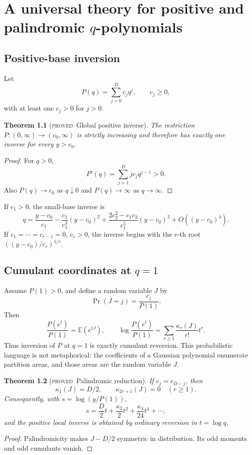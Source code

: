 \documentclass[11pt,letterpaper,oneside,openany]{book}
\newtheorem{theorem}{Theorem}[chapter]
\theoremstyle{definition}
\theoremstyle{remark}
\newcommand{\statusproved}{\textcolor{provedgreen}{\textsc{proved}}}
\begin{document}
\chapter{A universal theory for positive and palindromic \texorpdfstring{\(q\)}{q}-polynomials}

\section{Positive-base inversion}
Let
\[
 P(q)=\sum_{j=0}^{D}c_jq^j,
 \qquad c_j\ge0,
\]
with at least one \(c_j>0\) for \(j>0\).

\begin{theorem}[\statusproved\ Global positive inverse]
The restriction \(P:(0,\infty)\to(c_0,\infty)\) is strictly increasing and
therefore has exactly one inverse for every \(y>c_0\).
\end{theorem}
\begin{proof}
For \(q>0\),
\[
 P'(q)=\sum_{j=1}^{D}jc_jq^{j-1}>0.
\]
Also \(P(q)\to c_0\) as \(q\downarrow0\) and \(P(q)\to\infty\) as
\(q\to\infty\).
\end{proof}

If \(c_1>0\), the small-base inverse is
\[
 q=\frac{y-c_0}{c_1}-\frac{c_2}{c_1^3}(y-c_0)^2
 +\frac{2c_2^2-c_1c_3}{c_1^5}(y-c_0)^3+O((y-c_0)^4).
\]
If \(c_1=\cdots=c_{r-1}=0\), \(c_r>0\), the inverse begins with the
\(r\)-th root \(((y-c_0)/c_r)^{1/r}\).

\section{Cumulant coordinates at \texorpdfstring{\(q=1\)}{q=1}}
Assume \(P(1)>0\), and define a random variable \(J\) by
\[
 \Pr(J=j)=\frac{c_j}{P(1)}.
\]
Then
\[
 \frac{P(e^t)}{P(1)}=\mathbb E(e^{tJ}),
 \qquad
 \log\frac{P(e^t)}{P(1)}
 =\sum_{r\ge1}\frac{\kappa_r(J)}{r!}t^r.
\]
Thus inversion of \(P\) at \(q=1\) is exactly cumulant reversion.  This
probabilistic language is not metaphorical: the coefficients of a Gaussian
polynomial enumerate partition areas, and those areas are the random variable
\(J\).

\begin{theorem}[\statusproved\ Palindromic reduction]
If \(c_j=c_{D-j}\), then
\[
 \kappa_1(J)=D/2,
 \qquad
 \kappa_{2r+1}(J)=0\quad(r\ge1).
\]
Consequently, with \(s=\log(y/P(1))\),
\[
 s=\frac D2t+\frac{\kappa_2}{2}t^2+\frac{\kappa_4}{24}t^4+\cdots,
\]
and the positive local inverse is obtained by ordinary reversion in \(t=\log q\).
\end{theorem}
\begin{proof}
Palindromicity makes \(J-D/2\) symmetric in distribution.  Its odd moments and
odd cumulants vanish.
\end{proof}
\end{document}
